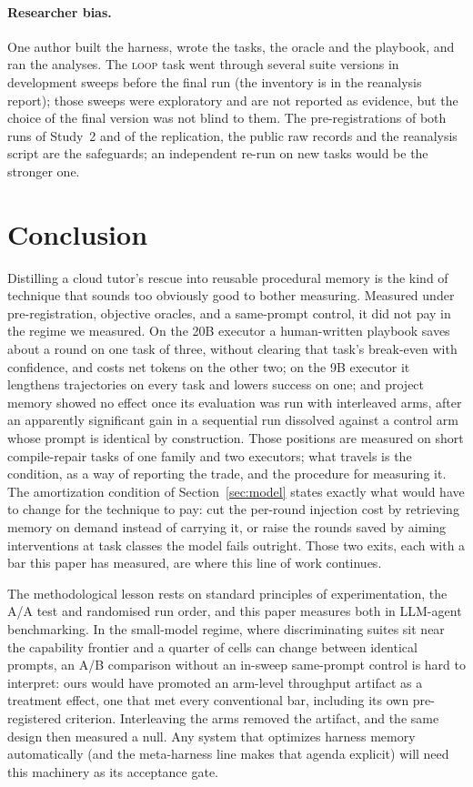 \documentclass[smallcondensed,natbib]{svjour3}
\begin{document}
\paragraph{Researcher bias.} One author built the harness, wrote the
tasks, the oracle and the playbook, and ran the analyses. The
\textsc{loop} task went through several suite versions in development
sweeps before the final run (the inventory is in the reanalysis
report); those sweeps were exploratory and are not reported as
evidence, but the choice of the final version was not blind to them.
The pre-registrations of both runs of Study~2 and of the replication,
the public raw records and the reanalysis script are the safeguards;
an independent re-run on new tasks would be the stronger one.

\section{Conclusion}\label{sec:conclusion}

Distilling a cloud tutor's rescue into reusable procedural memory is
the kind of technique that sounds too obviously good to bother
measuring. Measured under pre-registration, objective oracles, and a
same-prompt control, it did not pay in the regime we measured. On the
20B executor a human-written playbook saves about a round on one task
of three, without clearing that task's break-even with confidence, and
costs net tokens on the other two; on the 9B executor it lengthens
trajectories on every task and lowers success on one; and project
memory showed no effect once its evaluation was run with interleaved
arms, after an apparently significant gain in a sequential run
dissolved against a control arm whose prompt is identical by
construction. Those positions are
measured on short compile-repair tasks of one family and two
executors; what travels is the condition, as a way of reporting the
trade, and the procedure for measuring it. The amortization condition of
Section~\ref{sec:model} states exactly what would have to change for
the technique to pay: cut the per-round injection cost by retrieving
memory on demand instead of carrying it, or raise the rounds saved by
aiming interventions at task classes the model fails outright. Those
two exits, each with a bar this paper has measured, are where this
line of work continues.

The methodological lesson rests on standard principles of
experimentation, the A/A test and randomised run order, and this paper
measures both in LLM-agent benchmarking. In the small-model regime,
where discriminating suites sit near the capability frontier and a
quarter of cells can change between identical prompts, an A/B
comparison without an in-sweep same-prompt control is hard to
interpret: ours would have promoted an arm-level throughput artifact
as a treatment effect, one that met every conventional bar, including
its own pre-registered criterion. Interleaving the arms removed the
artifact, and the same design then measured a null. Any system that optimizes harness
memory automatically (and the meta-harness line makes that agenda
explicit) will need this machinery as its acceptance gate.
\end{document}
